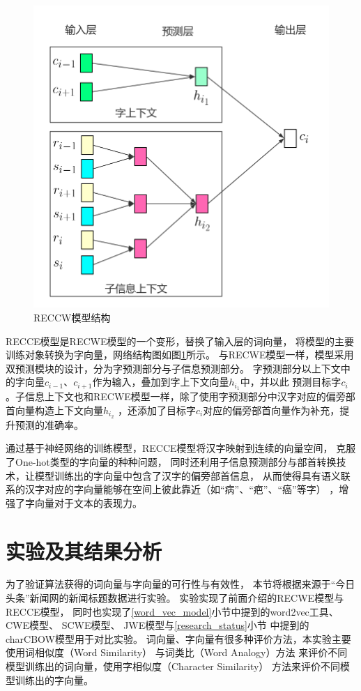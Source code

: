 \begin{figure}
    \includegraphics[scale=0.4]{picture/RECCE.png}
    \caption{RECCW模型结构}
    \label{RECCE}
\end{figure}
RECCE模型是RECWE模型的一个变形，替换了输入层的词向量，
将模型的主要训练对象转换为字向量，网络结构图如图\ref{RECCE}所示。
与RECWE模型一样，模型采用双预测模块的设计，分为字预测部分与子信息预测部分。
字预测部分以上下文中的字向量$c_{i-1}$、$c_{i+1}$作为输入，叠加到字上下文向量$h_{i_1}$中，并以此
预测目标字$c_i$。子信息上下文也和RECWE模型一样，除了使用字预测部分中汉字对应的偏旁部首向量构造上下文向量$h_{i_2}$
，还添加了目标字$c_i$对应的偏旁部首向量作为补充，提升预测的准确率。

通过基于神经网络的训练模型，RECCE模型将汉字映射到连续的向量空间，
克服了One-hot类型的字向量的种种问题，
同时还利用子信息预测部分与部首转换技术，让模型训练出的字向量中包含了汉字的偏旁部首信息，
从而使得具有语义联系的汉字对应的字向量能够在空间上彼此靠近（如“病”、“疤”、“癌”等字）
，增强了字向量对于文本的表现力。



\section{实验及其结果分析}
为了验证算法获得的词向量与字向量的可行性与有效性，
本节将根据来源于“今日头条”新闻网的新闻标题数据进行实验。
实验实现了前面介绍的RECWE模型与RECCE模型，
同时也实现了\ref{word_vec_model}小节中提到的word2vec工具、
CWE模型、
SCWE模型、
JWE模型与\ref{research_status}小节
中提到的charCBOW模型用于对比实验。
词向量、字向量有很多种评价方法，本实验主要使用词相似度（Word Similarity）
与词类比（Word Analogy）方法
来评价不同模型训练出的词向量，使用字相似度（Character Similarity）
方法来评价不同模型训练出的字向量。
